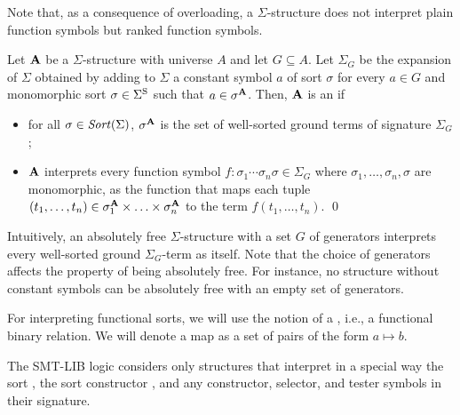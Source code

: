Note that, as a consequence of overloading,
a $\Sigma$-structure does not interpret plain function symbols
but ranked function symbols.


\begin{definition}
Let $\mathbf{A}$ be a $\Sigma$-structure with universe $A$ and 
let $G \subseteq A$.
Let $\Sigma_G$ be the expansion of $\Sigma$ obtained by adding to $\Sigma$
a constant symbol $a$ of sort $\sigma$
for every $a \in G$ and monomorphic sort $\sigma \in \Sigma^\mathrm{S}$ 
such that $a \in \sigma^{\mathbf{A}}$.
Then, $\mathbf{A}$ is an 
if 
\begin{itemize}
\item
for all $\sigma \in \mathit{Sort}(\Sigma)$, $\sigma^{\mathbf{A}}$ is the set 
of well-sorted ground terms of signature $\Sigma_G$;

\item
$\mathbf{A}$ interprets every function symbol 
$f{:}\sigma_1 \cdots \sigma_n \sigma \in \Sigma_G$ 
where $\sigma_1, \ldots, \sigma_n, \sigma$ are monomorphic,
as the function that maps each tuple 
$(t_1,\ldots,t_n) \in \sigma_1^{\mathbf{A}} \times \ldots \times \sigma_n^{\mathbf{A}}$ 
to the term $f(t_1,\ldots,t_n)$.
\qed
\end{itemize}
\end{definition}

Intuitively, an absolutely free $\Sigma$-structure with a set $G$ of generators
interprets every well-sorted ground $\Sigma_G$-term as itself.
Note that the choice of generators affects the property of being absolutely free.
For instance, no structure without constant symbols can be absolutely free 
with an empty set of generators.
\medskip

For interpreting functional sorts, we will use the notion of a , i.e., a functional binary relation.
We will denote a map as a set of pairs of the form $a\mapsto b$.

\medskip
The SMT-LIB logic considers only structures that interpret in a special way 
the sort \bool, the sort constructor \fconstruct, and any constructor, selector, and tester symbols in their signature.

